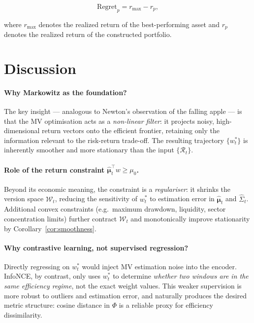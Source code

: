 \documentclass[preprint,12pt]{elsarticle}
\theoremstyle{plain}
\theoremstyle{definition}
\newcommand{\calR}{\mathcal{R}}
\newcommand{\calW}{\mathcal{W}}
\newcommand{\bmu}{\bm{\mu}}
\begin{document}
\begin{equation}
	\label{eq:Regret}
	\mathrm{Regret}_p=r_{\max}-r_p,
\end{equation}

where $r_{\max}$ denotes the realized return of the best-performing asset and $r_p$ denotes the realized return of the constructed portfolio.



\section{Discussion}
\label{sec:discussion}

\paragraph{Why Markowitz as the foundation?}
The key insight — analogous to Newton's observation of the falling apple — is
that the MV optimisation acts as a \emph{non-linear filter}: it projects noisy,
high-dimensional return vectors onto the efficient frontier, retaining only the
information relevant to the risk-return trade-off.  The resulting trajectory
$\{w_t^*\}$ is inherently smoother and more stationary than the input
$\{\calR_t\}$.

\paragraph{Role of the return constraint $\hat{\bmu}_t^\top w \ge \mu_0$.}
Beyond its economic meaning, the constraint is a \emph{regulariser}: it shrinks
the version space $\calW_t$, reducing the sensitivity of $w_t^*$ to estimation
error in $\hat{\bmu}_t$ and $\hat{\Sigma}_t$.  Additional convex constraints
(e.g.\ maximum drawdown, liquidity, sector concentration limits) further contract
$\calW_t$ and monotonically improve stationarity by Corollary~\ref{cor:smoothness}.

\paragraph{Why contrastive learning, not supervised regression?}
Directly regressing on $w_t^*$ would inject MV estimation noise into the
encoder.  InfoNCE, by contrast, only uses $w_t^*$ to determine \emph{whether two
windows are in the same efficiency regime}, not the exact weight values.  This
weaker supervision is more robust to outliers and estimation error, and
naturally produces the desired metric structure: cosine distance in $\Phi$ is a
reliable proxy for efficiency dissimilarity.
\end{document}

